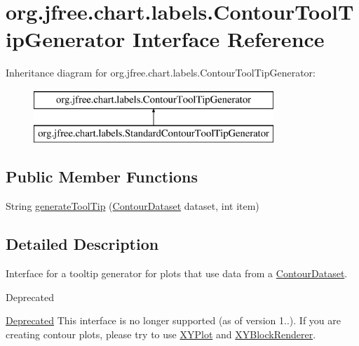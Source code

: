 \hypertarget{interfaceorg_1_1jfree_1_1chart_1_1labels_1_1_contour_tool_tip_generator}{}\section{org.\+jfree.\+chart.\+labels.\+Contour\+Tool\+Tip\+Generator Interface Reference}
\label{interfaceorg_1_1jfree_1_1chart_1_1labels_1_1_contour_tool_tip_generator}
Inheritance diagram for org.\+jfree.\+chart.\+labels.\+Contour\+Tool\+Tip\+Generator\+:\begin{figure}[H]
\begin{center}
\leavevmode
\includegraphics[height=2.000000cm]{interfaceorg_1_1jfree_1_1chart_1_1labels_1_1_contour_tool_tip_generator}
\end{center}
\end{figure}
\subsection*{Public Member Functions}
\begin{DoxyCompactItemize}
\item 
String \mbox{\hyperlink{interfaceorg_1_1jfree_1_1chart_1_1labels_1_1_contour_tool_tip_generator_a667a729e1865dc84fccab2eff1ed0c9e}{generate\+Tool\+Tip}} (\mbox{\hyperlink{interfaceorg_1_1jfree_1_1data_1_1contour_1_1_contour_dataset}{Contour\+Dataset}} dataset, int item)
\end{DoxyCompactItemize}


\subsection{Detailed Description}
Interface for a tooltip generator for plots that use data from a \mbox{\hyperlink{}{Contour\+Dataset}}.

\begin{DoxyRefDesc}{Deprecated}
\item[\mbox{\hyperlink{deprecated__deprecated000050}{Deprecated}}]This interface is no longer supported (as of version 1..). If you are creating contour plots, please try to use \mbox{\hyperlink{}{X\+Y\+Plot}} and \mbox{\hyperlink{}{X\+Y\+Block\+Renderer}}. \end{DoxyRefDesc}


